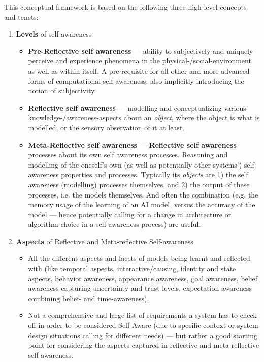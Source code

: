 	This conceptual framework is based on the following three high-level concepts and tenets:
	\begin{enumerate}
		\item \textbf{Levels} of self awareness
		\begin{itemize}
			\item \textbf{Pre-Reflective self awareness} — ability to subjectively and uniquely perceive and experience phenomena in the physical-/social-environment as well as within itself. A pre-requisite for all other and more advanced forms of computational self awareness, also implicitly introducing the notion of subjectivity.
			\item \textbf{Reflective self awareness} — modelling and conceptualizing various knowledge-/awareness-aspects about an \textit{object}, where the object is what is modelled, or the sensory observation of it at least.
			\item \textbf{Meta-Reflective self awareness} — \textbf{Reflective self awareness} processes about its own self awareness processes. Reasoning and modelling of the oneself's own (as well as potentially other systems') self awareness properties and processes. Typically its \textit{objects} are 1) the self awareness (modelling) processes themselves, and 2) the output of these processes, i.e. the models themselves. And often the combination (e.g. the memory usage of the learning of an AI model, versus the accuracy of the model — hence potentially calling for a change in architecture or algorithm-choice in a self awareness process) are useful.
		\end{itemize}
		
		\item \textbf{Aspects} of Reflective and Meta-reflective Self-awareness
			\begin{itemize}
				\item All the different aspects and facets of models being learnt and reflected with (like temporal aspects, interactive/causing, identity and state aspects, behavior awareness, appearance awareness, goal awareness, belief awareness capturing uncertainty and trust-levels, expectation awareness combining belief- and time-awareness).
				\item Not a comprehensive and large list of requirements a system has to check off in order to be considered Self-Aware (due to specific context or system design situations calling for different needs) — but rather a good starting point for considering the aspects captured in reflective and meta-reflective self awareness.
			\end{itemize}
			

\end{enumerate}
